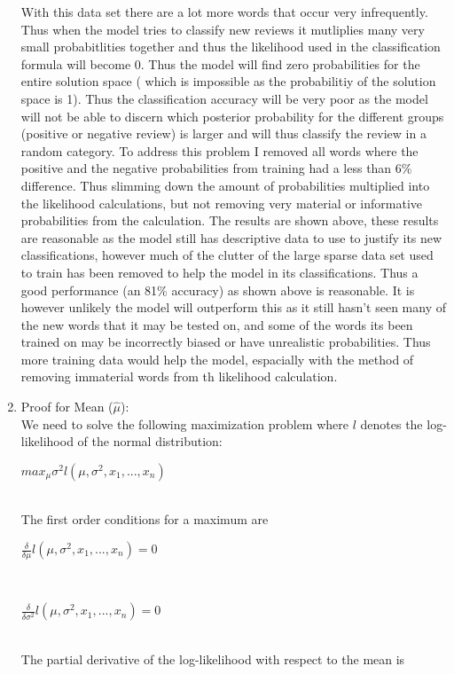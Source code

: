 \documentclass{article}
\begin{document}
\begin{enumerate}
			With this data set there are a lot more words that occur very infrequently. Thus when the model tries to classify new reviews it mutliplies many very small probabitlities together and thus the likelihood used in the classification formula will become 0. Thus the model will find zero probabilities for the entire solution space ( which is impossible as the probabilitiy of the solution space is 1). Thus the classification accuracy will be very poor as the model will not be able to discern which posterior probability for the different groups (positive or negative review) is larger and will thus classify the review in a random category. To address this problem I removed all words where the positive and the negative probabilities from training had a less than 6\% difference. Thus slimming down the amount of probabilities multiplied into the likelihood calculations, but not removing very material or informative probabilities from the calculation. The results are shown above, these results are reasonable as the model still has descriptive data to use to justify its new classifications, however much of the clutter of the large sparse data set used to train has been removed  to help the model in its classifications. Thus a good performance (an 81\% accuracy) as shown above is reasonable. It is however unlikely the model will outperform this as it still hasn't seen many of the new words that it may be tested on, and some of the words its been trained on may be incorrectly biased or have unrealistic probabilities. Thus more training data would help the model, espacially with the method of removing immaterial words from th likelihood calculation.
		\newpage		
		\item
			Proof for Mean ($\hat \mu$): \\
				We need to solve the following maximization problem where $ \textit{l} $ denotes the log-likelihood of the normal distribution: \\
				\centerline{$ max_\mu\sigma^2 l(\mu,\sigma^2, x_1, ..., x_n)$} \\
				The first order conditions for a maximum are \\
				\centerline{$\frac{\delta}{\delta\mu} l(\mu,\sigma^2, x_1, ..., x_n) = 0$} \\
				\centerline{$\frac{\delta}{\delta\sigma^2} l(\mu,\sigma^2, x_1, ..., x_n) = 0$} \\
				The partial derivative of the log-likelihood with respect to the mean is \\ 

\end{enumerate}
\end{document}
